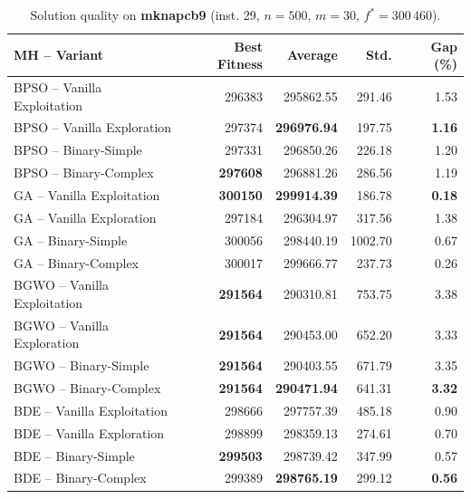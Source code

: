 \begin{table}[htbp]
  \centering
  \small
  \caption{Solution quality on \textbf{mknapcb9} (inst. 29, $n=500$, $m=30$, $f^*=300\,460$).}
  \label{tab:calidad_mknapcb9_29}
  \begin{tabular}{lrrrr}
    \toprule
    \textbf{MH -- Variant} &
    \textbf{Best Fitness} &
    \textbf{Average} &
    \textbf{Std.} &
    \textbf{Gap (\%)} \\
    \midrule
    BPSO -- Vanilla Exploitation &         296383 &        295862.55 & 291.46 &         1.53 \\
    BPSO -- Vanilla Exploration  &         297374 & \textbf{296976.94} & 197.75 & \textbf{1.16} \\
    BPSO -- Binary-Simple        &         297331 &        296850.26 & 226.18 &         1.20 \\
    BPSO -- Binary-Complex       & \textbf{297608} &        296881.26 & 286.56 &         1.19 \\
    \midrule
    GA -- Vanilla Exploitation   & \textbf{300150} & \textbf{299914.39} & 186.78 & \textbf{0.18} \\
    GA -- Vanilla Exploration    &         297184 &        296304.97 & 317.56 &         1.38 \\
    GA -- Binary-Simple          &         300056 &        298440.19 & 1002.70 &         0.67 \\
    GA -- Binary-Complex         &         300017 &        299666.77 & 237.73 &         0.26 \\
    \midrule
    BGWO -- Vanilla Exploitation & \textbf{291564} &        290310.81 & 753.75 &         3.38 \\
    BGWO -- Vanilla Exploration  & \textbf{291564} &        290453.00 & 652.20 &         3.33 \\
    BGWO -- Binary-Simple        & \textbf{291564} &        290403.55 & 671.79 &         3.35 \\
    BGWO -- Binary-Complex       & \textbf{291564} & \textbf{290471.94} & 641.31 & \textbf{3.32} \\
    \midrule
    BDE -- Vanilla Exploitation  &         298666 &        297757.39 & 485.18 &         0.90 \\
    BDE -- Vanilla Exploration   &         298899 &        298359.13 & 274.61 &         0.70 \\
    BDE -- Binary-Simple         & \textbf{299503} &        298739.42 & 347.99 &         0.57 \\
    BDE -- Binary-Complex        &         299389 & \textbf{298765.19} & 299.12 & \textbf{0.56} \\
    \bottomrule
  \end{tabular}
\end{table}
